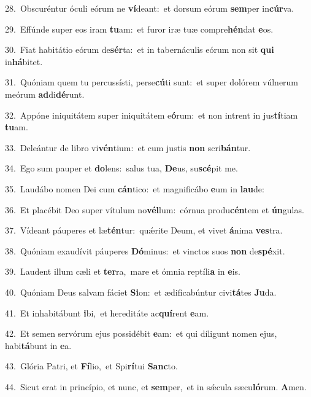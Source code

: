 {\numbfont\textcolor{\numbcolor}{28.}}~Obscuréntur óculi eórum ne \textbf{ví}\-deant:~\star et dorsum eórum \textbf{sem}\-per in\-\textbf{cúr}\-va.\par
{\numbfont\textcolor{\numbcolor}{29.}}~Effúnde super eos iram \textbf{tu}\-am:~\star et furor iræ tuæ compre\-\textbf{hén}\-dat \textbf{e}\-os.\par
{\numbfont\textcolor{\numbcolor}{30.}}~Fiat habitátio eórum de\-\textbf{sér}\-ta:~\star et in tabernáculis eórum non sit \textbf{qui} in\-\textbf{há}\-bitet.\par
{\numbfont\textcolor{\numbcolor}{31.}}~Quóniam quem tu percussísti, perse\-\textbf{cú}\-ti sunt:~\star et super dolórem vúlnerum meórum \textbf{ad}\-di\-\textbf{dé}\-runt.\par
{\numbfont\textcolor{\numbcolor}{32.}}~Appóne iniquitátem super iniquitátem e\-\textbf{ó}\-rum:~\star et non intrent in jus\-\textbf{tí}\-tiam \textbf{tu}\-am.\par
{\numbfont\textcolor{\numbcolor}{33.}}~Deleántur de libro vi\-\textbf{vén}\-tium:~\star et cum justis \textbf{non} scri\-\textbf{bán}\-tur.\par
{\numbfont\textcolor{\numbcolor}{34.}}~Ego sum pauper et \textbf{do}\-lens:~\star salus tua, \textbf{De}\-us, su\-\textbf{scé}\-pit me.\par
{\numbfont\textcolor{\numbcolor}{35.}}~Laudábo nomen Dei cum \textbf{cán}\-tico:~\star et magnificábo \textbf{e}\-um in \textbf{lau}\-de:\par
{\numbfont\textcolor{\numbcolor}{36.}}~Et placébit Deo super vítulum no\-\textbf{vél}\-lum:~\star córnua produ\-\textbf{cén}\-tem et \textbf{ún}\-gulas.\par
{\numbfont\textcolor{\numbcolor}{37.}}~Vídeant páuperes et læ\-\textbf{tén}\-tur:~\star quǽrite Deum, et vivet \textbf{á}\-nima \textbf{ves}\-tra.\par
{\numbfont\textcolor{\numbcolor}{38.}}~Quóniam exaudívit páuperes \textbf{Dó}\-minus:~\star et vinctos suos \textbf{non} de\-\textbf{spé}\-xit.\par
{\numbfont\textcolor{\numbcolor}{39.}}~Laudent illum cæli et \textbf{ter}\-ra,~\star mare et ómnia reptíli\textbf{a} in \textbf{e}\-is.\par
{\numbfont\textcolor{\numbcolor}{40.}}~Quóniam Deus salvam fáciet \textbf{Si}\-on:~\star et ædificabúntur civi\-\textbf{tá}\-tes \textbf{Ju}\-da.\par
{\numbfont\textcolor{\numbcolor}{41.}}~Et inhabitábunt \textbf{i}\-bi,~\star et hereditáte ac\-\textbf{quí}\-rent \textbf{e}\-am.\par
{\numbfont\textcolor{\numbcolor}{42.}}~Et semen servórum ejus possidébit \textbf{e}\-am:~\star et qui díligunt nomen ejus, habi\-\textbf{tá}\-bunt in \textbf{e}\-a.\par
{\numbfont\textcolor{\numbcolor}{43.}}~Glória Patri, et \textbf{Fí}\-lio,~\star et Spi\-\textbf{rí}\-tui \textbf{Sanc}\-to.\par
{\numbfont\textcolor{\numbcolor}{44.}}~Sicut erat in princípio, et nunc, et \textbf{sem}\-per,~\star et in sǽcula sæcu\-\textbf{ló}\-rum. \textbf{A}\-men.\par
